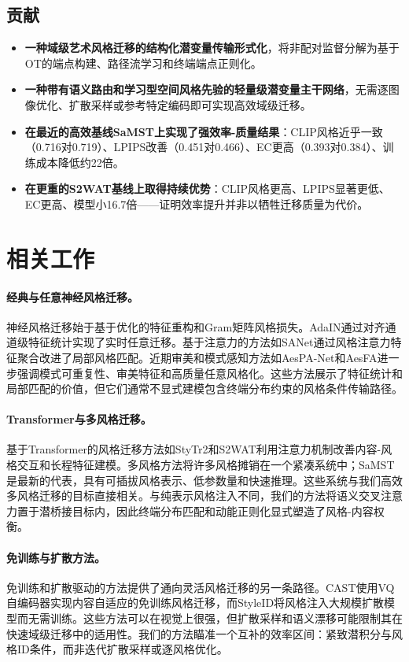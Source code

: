 ﻿\documentclass[letterpaper]{article}
\begin{document}
\subsection{贡献}
\begin{itemize}
    \item \textbf{一种域级艺术风格迁移的结构化潜变量传输形式化}，将非配对监督分解为基于OT的端点构建、路径流学习和终端端点正则化。
    \item \textbf{一种带有语义路由和学习型空间风格先验的轻量级潜变量主干网络}，无需逐图像优化、扩散采样或参考特定编码即可实现高效域级迁移。
    \item \textbf{在最近的高效基线SaMST上实现了强效率-质量结果}：CLIP风格近乎一致（0.716对0.719）、LPIPS改善（0.451对0.466）、EC更高（0.393对0.384）、训练成本降低约22倍。
    \item \textbf{在更重的S2WAT基线上取得持续优势}：CLIP风格更高、LPIPS显著更低、EC更高、模型小16.7倍——证明效率提升并非以牺牲迁移质量为代价。
\end{itemize}

\section{相关工作}
\paragraph{经典与任意神经风格迁移。}
神经风格迁移始于基于优化的特征重构和Gram矩阵风格损失\cite{gatys2016image}。AdaIN通过对齐通道级特征统计实现了实时任意迁移\cite{huang2017adain}。基于注意力的方法如SANet通过风格注意力特征聚合改进了局部风格匹配\cite{park2019sanet}。近期审美和模式感知方法如AesPA-Net和AesFA进一步强调模式可重复性、审美特征和高质量任意风格化\cite{hong2023aespa,huang2024aesfa}。这些方法展示了特征统计和局部匹配的价值，但它们通常不显式建模包含终端分布约束的风格条件传输路径。

\paragraph{Transformer与多风格迁移。}
基于Transformer的风格迁移方法如StyTr2和S2WAT利用注意力机制改善内容-风格交互和长程特征建模\cite{deng2022stytr2,xia2024s2wat}。多风格方法将许多风格摊销在一个紧凑系统中；SaMST是最新的代表，具有可插拔风格表示、低参数量和快速推理\cite{liu2024samst}。这些系统与我们高效多风格迁移的目标直接相关。与纯表示风格注入不同，我们的方法将语义交叉注意力置于潜桥接目标内，因此终端分布匹配和动能正则化显式塑造了风格-内容权衡。

\paragraph{免训练与扩散方法。}
免训练和扩散驱动的方法提供了通向灵活风格迁移的另一条路径。CAST使用VQ自编码器实现内容自适应的免训练风格迁移\cite{gim2024cast}，而StyleID将风格注入大规模扩散模型而无需训练\cite{chung2024styleid}。这些方法可以在视觉上很强，但扩散采样和语义漂移可能限制其在快速域级迁移中的适用性。我们的方法瞄准一个互补的效率区间：紧致潜积分与风格ID条件，而非迭代扩散采样或逐风格优化。
\end{document}
